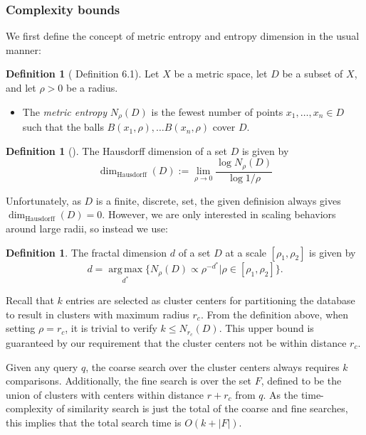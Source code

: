 \documentclass[review,preprint,12pt]{elsarticle}
\renewcommand{\cite}{\citep} %
\theoremstyle{definition}
\newtheorem{definition}[theorem]{Definition}
\theoremstyle{remark}
\begin{document}
\subsubsection{Complexity bounds}
We first define the concept of metric entropy and entropy dimension in the usual manner:
\begin{definition}[\cite{tao2008product} Definition 6.1] 
    Let $X$ be a metric space, let $D$ be a subset of $X$, and let $\rho>0$ be a radius.
    \begin{itemize}
        \item The \textit{metric entropy} $N_\rho(D)$ is the fewest number of points $x_1, \ldots, x_n \in D$ such that the balls $B(x_1,\rho), \ldots B(x_n,\rho)$ cover $D$.
    \end{itemize}
\end{definition}
\begin{definition}[\cite{falconer1990fractal}]
    The Hausdorff dimension of a set $D$ is given by 
\[
    \dim_{\text{Hausdorff}}(D) := \lim_{\rho \to 0} \frac{\log N_\rho(D)}{\log 1/\rho}
\]
\end{definition}
Unfortunately, as $D$ is a finite, discrete, set, the given definision always gives $\dim_{\text{Hausdorff}}(D) = 0$.
However, we are only interested in scaling behaviors around large radii, so instead we use:
\begin{definition}
    The fractal dimension $d$ of a set $D$ at a scale $[\rho_1,\rho_2]$ is given by
    \[
        d = \operatorname*{arg\,max}_{d^*} \{ N_\rho(D) \propto \rho^{-d^*} | \rho \in [\rho_1,\rho_2] \}.
    \]
\end{definition}

Recall that $k$ entries are selected as cluster centers for partitioning the database to result in clusters with maximum radius $r_c$.
From the definition above, when setting $\rho = r_c$, it is trivial to verify $ k \le N_{r_c} (D)$.
This upper bound is guaranteed by our requirement that the cluster centers not be within distance $r_c$.

Given any query $q$, the coarse search over the cluster centers always requires $k$ comparisons.
Additionally, the fine search is over the set $F$, defined to be the union of clusters with centers within distance $r+r_c$ from $q$.
As the time-complexity of similarity search is just the total of the coarse and fine searches, this implies that the total search time is $O(k + |F|)$.
\end{document}
